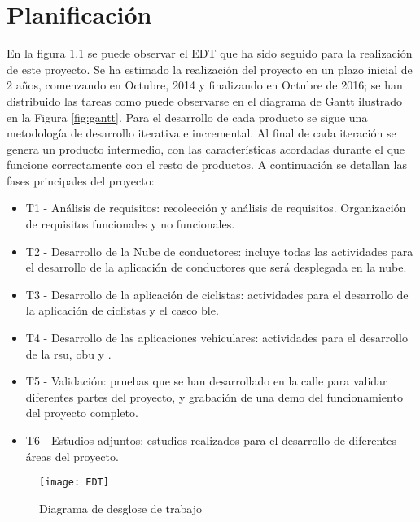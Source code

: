 \chapter{Planificación}
En la figura \ref{fig:edt} se puede observar el EDT que ha sido seguido para la realización de este proyecto. Se ha estimado la realización del proyecto en un plazo inicial de 2 años, comenzando en Octubre, 2014 y finalizando en Octubre de 2016; se han distribuido las tareas como puede observarse en el diagrama de Gantt ilustrado en la Figura \ref{fig:gantt}. Para el desarrollo de cada producto se sigue una metodología de desarrollo iterativa e incremental. Al final de cada iteración se genera un producto intermedio, con las características acordadas durante el que funcione correctamente con el resto de productos.  A continuación se detallan las fases principales del proyecto:
\begin{itemize}
	\item T1 - Análisis de requisitos: recolección y análisis de requisitos. Organización de requisitos funcionales y no funcionales.

	\item T2 - Desarrollo de la Nube de conductores: incluye todas las actividades para el	desarrollo de la aplicación de conductores que será desplegada en la nube.

	\item T3 - Desarrollo de la aplicación de ciclistas: actividades para el desarrollo de la aplicación de ciclistas y el casco \gls{ble}.

	\item T4 - Desarrollo de las aplicaciones vehiculares: actividades para el desarrollo de la \gls{rsu}, \gls{obu} y .

	\item T5 - Validación: pruebas que se han desarrollado en la calle para validar diferentes partes del proyecto, y grabación de una demo del funcionamiento del proyecto completo.

	\item T6 - Estudios adjuntos: estudios realizados para el desarrollo de diferentes áreas del proyecto.
\end{itemize}

\begin{figure}[t]
	\begin{center}
		 {
			\texttt{[image: EDT]}
		}
		\caption{Diagrama de desglose de trabajo}
		\label{fig:edt}
	\end{center}
\end{figure}

